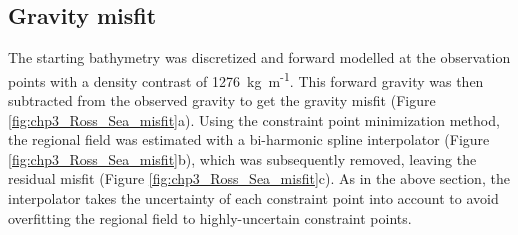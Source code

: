 \subsection{Gravity misfit}

The starting bathymetry was discretized and forward modelled at the observation points with a density contrast of 1276~kg~m\textsuperscript{-1}. This forward gravity was then subtracted from the observed gravity to get the gravity misfit (Figure \ref{fig:chp3_Ross_Sea_misfit}a). Using the constraint point minimization method, the regional field was estimated with a bi-harmonic spline interpolator (Figure \ref{fig:chp3_Ross_Sea_misfit}b), which was subsequently removed, leaving the residual misfit (Figure \ref{fig:chp3_Ross_Sea_misfit}c). As in the above section, the interpolator takes the uncertainty of each constraint point into account to avoid overfitting the regional field to highly-uncertain constraint points. \\


